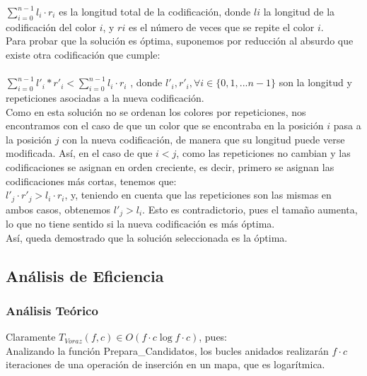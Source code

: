 \documentclass[a4paper,12pt,twoside]{article} %
\begin{document}
$\sum_{i=0}^{n-1} l_i \cdot{r_i}$ es la longitud total de la codificación, donde $li$ la longitud de la codificación del color $i$, y $ri$ es el número de veces que se repite el color $i$.\\

Para probar que la solución es óptima, suponemos por reducción al absurdo que existe otra codificación que cumple:\\
\\
$\sum_{i=0}^{n-1} l'_i*r'_i < \sum_{i=0}^{n-1} l_i \cdot{r_i} $ , donde $l'_i, r'_i,  \forall i \in \{0,1,...n-1\}$ son la longitud y repeticiones asociadas a la nueva codificación.\\

Como en esta solución no se ordenan los colores por repeticiones, nos encontramos con el caso de que un color que se encontraba en la posición $i$ pasa a la posición $j$ con la nueva codificación, de manera que su longitud puede verse modificada. Así, en el caso de que $i<j$, como las repeticiones no cambian y las codificaciones se asignan en orden creciente, es decir, primero se asignan las codificaciones más cortas, tenemos que:\\

$l'_j \cdot {r'_j} > l_i \cdot {r_i}$, y, teniendo en cuenta que las repeticiones son las mismas en ambos casos, obtenemos $l'_j>l_i$. Esto es contradictorio, pues el tamaño aumenta, lo que no tiene sentido si la nueva codificación es más óptima.\\

Así, queda demostrado que la solución seleccionada es la óptima.



\newpage

\subsection{Análisis de Eficiencia}

\subsubsection{Análisis Teórico}

Claramente $T_{Voraz}(f,c) \in O(f \cdot{c} \log{f \cdot{c}})$, pues:\\

Analizando la función Prepara\_Candidatos, los bucles anidados realizarán $f \cdot {c} $ iteraciones de una operación de inserción en un mapa, que es logarítmica.
\end{document}
